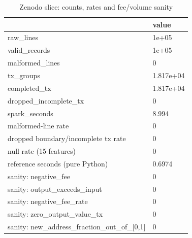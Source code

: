 \begin{table}
\caption{Zenodo slice: counts, rates and fee/volume sanity}
\label{tab:01A_zenodo_integrity}
\begin{tabular}{ll}
\toprule
 & value \\
\midrule
raw\_lines & 1e+05 \\
valid\_records & 1e+05 \\
malformed\_lines & 0 \\
tx\_groups & 1.817e+04 \\
completed\_tx & 1.817e+04 \\
dropped\_incomplete\_tx & 0 \\
spark\_seconds & 8.994 \\
malformed-line rate & 0 \\
dropped boundary/incomplete tx rate & 0 \\
null rate (15 features) & 0 \\
reference seconds (pure Python) & 0.6974 \\
sanity: negative\_fee & 0 \\
sanity: output\_exceeds\_input & 0 \\
sanity: negative\_fee\_rate & 0 \\
sanity: zero\_output\_value\_tx & 0 \\
sanity: new\_address\_fraction\_out\_of\_[0,1] & 0 \\
\bottomrule
\end{tabular}
\end{table}
